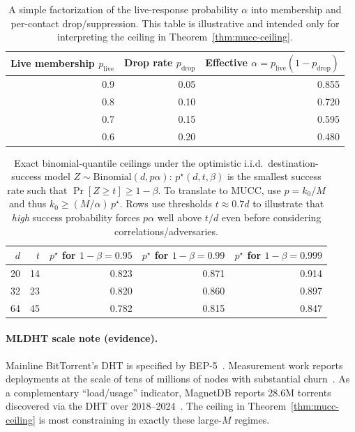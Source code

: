 \documentclass[11pt]{article}
\begin{document}
\begin{table}[h]
\centering
\begin{tabular}{@{}rrr@{}}
\toprule
Live membership $p_{\mathrm{live}}$ & Drop rate $p_{\mathrm{drop}}$ & Effective $\alpha=p_{\mathrm{live}}(1-p_{\mathrm{drop}})$ \\
\midrule
0.9 & 0.05 & 0.855 \\
0.8 & 0.10 & 0.720 \\
0.7 & 0.15 & 0.595 \\
0.6 & 0.20 & 0.480 \\
\bottomrule
\end{tabular}
\caption{A simple factorization of the live-response probability $\alpha$ into membership and per-contact drop/suppression.
This table is illustrative and intended only for interpreting the ceiling in Theorem~\ref{thm:mucc-ceiling}.}
\label{tab:alpha}
\end{table}


\begin{table}[h]
\centering
\begin{tabular}{@{}rrrrr@{}}
\toprule
$d$ & $t$ & $p^\star$ for $1-\beta=0.95$ & $p^\star$ for $1-\beta=0.99$ & $p^\star$ for $1-\beta=0.999$ \\
\midrule
20 & 14 & 0.823 & 0.871 & 0.914 \\
32 & 23 & 0.820 & 0.860 & 0.897 \\
64 & 45 & 0.782 & 0.815 & 0.847 \\
\bottomrule
\end{tabular}
\caption{Exact binomial-quantile ceilings under the optimistic i.i.d.\ destination-success model $Z\sim\mathrm{Binomial}(d,p\alpha)$: 
$p^\star(d,t,\beta)$ is the smallest success rate such that $\Pr[Z\ge t]\ge 1-\beta$. 
To translate to MUCC, use $p = k_0/M$ and thus $k_0 \ge (M/\alpha)\,p^\star$. 
Rows use thresholds $t\approx 0.7d$ to illustrate that \emph{high} success probability forces $p\alpha$ well above $t/d$ even before considering correlations/adversaries.}
\label{tab:binom-quantile}
\end{table}


\paragraph{MLDHT scale note (evidence).}
Mainline BitTorrent's DHT is specified by BEP-5~\cite{bep5}.
Measurement work reports deployments at the scale of tens of millions of nodes with substantial churn~\cite{wang2013mldht,mldhtProjectPage}.
As a complementary ``load/usage'' indicator, MagnetDB reports 28.6M torrents discovered via the DHT over 2018--2024~\cite{magnetdb2025}.
The ceiling in Theorem~\ref{thm:mucc-ceiling} is most constraining in exactly these large-$M$ regimes.
\end{document}
